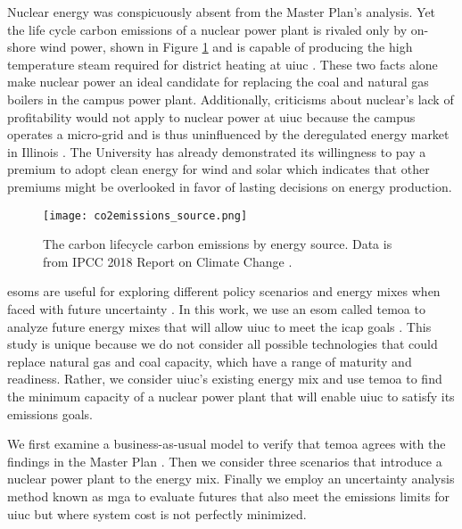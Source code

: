 Nuclear energy was conspicuously absent from the Master Plan's analysis. Yet
the life cycle carbon emissions of a nuclear power plant is rivaled only by on-
shore wind power, shown in Figure \ref{fig:co2sources} and is capable of
producing the high temperature steam required for district heating at
\gls{uiuc} \cite{allen_framing_2018}. These two facts alone make nuclear power
an ideal candidate for replacing the coal and natural gas boilers in the campus
power plant. Additionally, criticisms about nuclear's lack of profitability
would not apply to nuclear power at \gls{uiuc} because the campus operates a
micro-grid and is thus uninfluenced by the deregulated energy market in
Illinois \cite{clemmer_nuclear_2018, nian_economic_2020}. The University has
already demonstrated its willingness to pay a premium to adopt clean energy for
wind and solar
\cite{breitweiser_wind_2016,white_solar_2017,noauthor_solar_nodate} which
indicates that other premiums might be overlooked in favor of lasting decisions
on energy production.

\begin{figure}[h]
  \centering
  \texttt{[image: co2emissions\_source.png]}
  \caption{The carbon lifecycle carbon emissions by energy source. Data is from
  IPCC 2018 Report on Climate Change \cite{allen_framing_2018}.}
  \label{fig:co2sources}
\end{figure}

 \glspl{esom} are useful for
exploring different policy scenarios and energy mixes when faced with future
uncertainty
\cite{decarolis_modelling_2016,hunter_modeling_2013,li_open_2020,decarolis_multi-stage_nodate}.
In this work, we use an \gls{esom} called \gls{temoa}
to analyze future energy mixes that will allow \gls{uiuc} to meet the
\gls{icap} goals \cite{decarolis_tools_2020}. This study is unique because we do
not consider all possible technologies that could replace natural gas and coal
capacity, which have a range of maturity and readiness. Rather, we
consider \gls{uiuc}'s existing energy mix and use \gls{temoa} to find the
minimum capacity of a nuclear power plant that will enable \gls{uiuc} to
satisfy its emissions goals.

We first examine a business-as-usual model to verify that \gls{temoa} agrees
with the findings in the Master Plan
\cite{affiliated_engineers_inc_utilities_2015}. Then we consider three scenarios
that introduce a nuclear power plant to the energy mix. Finally we employ an
uncertainty analysis method known as \gls{mga} to evaluate futures
that also meet the emissions limits for \gls{uiuc} but where system cost is not
perfectly minimized.
